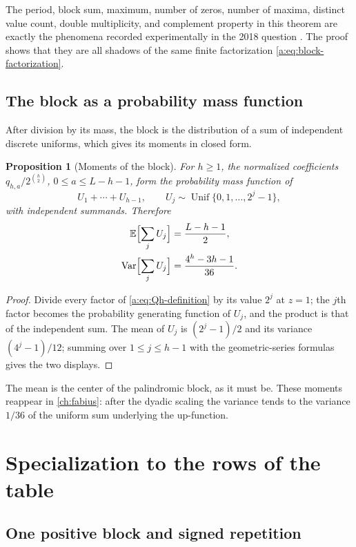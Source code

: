 \documentclass[11pt,a4paper,oneside,openany]{book}
\numberwithin{equation}{chapter}
\newtheorem{proposition}[theorem]{Proposition}
\theoremstyle{definition}
\theoremstyle{remark}
\begin{document}
The period, block sum, maximum, number of zeros, number of maxima, distinct
value count, double multiplicity, and complement property in this theorem are
exactly the phenomena recorded experimentally in the 2018 question
\cite{reshetnikov-mse}.  The proof shows that they are all shadows of the same
finite factorization \eqref{a:eq:block-factorization}.

\section{The block as a probability mass function}
After division by its mass, the block is the distribution of a sum of
independent discrete uniforms, which gives its moments in closed form.

\begin{proposition}[Moments of the block]\label{c:prop:pulse-moments}
For $h\ge1$, the normalized coefficients $q_{h,a}/2^{\binom h2}$,
$0\le a\le L-h-1$, form the probability mass function of
\[
 U_1+\cdots+U_{h-1},\qquad U_j\sim\operatorname{Unif}\{0,1,\ldots,2^j-1\},
\]
with independent summands. Therefore
\begin{align}
 \mathbb E\Bigl[\sum_jU_j\Bigr]&=\frac{L-h-1}{2},\label{c:eq:pulse-mean}\\
 \operatorname{Var}\Bigl[\sum_jU_j\Bigr]&=\frac{4^h-3h-1}{36}.\label{c:eq:pulse-var}
\end{align}
\end{proposition}
\begin{proof}
Divide every factor of \eqref{a:eq:Qh-definition} by its value $2^j$ at
$z=1$; the $j$th factor becomes the probability generating function of
$U_j$, and the product is that of the independent sum. The mean of $U_j$ is
$(2^j-1)/2$ and its variance $(4^j-1)/12$; summing over $1\le j\le h-1$
with the geometric-series formulas gives the two displays.
\end{proof}
The mean is the center of the palindromic block, as it must be. These
moments reappear in \cref{ch:fabius}: after the dyadic scaling the variance
tends to the variance $1/36$ of the uniform sum underlying the up-function.

\chapter{Specialization to the rows of the table}\label{ch:rows}

\section{One positive block and signed repetition}
\end{document}
